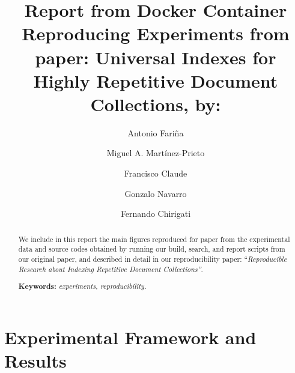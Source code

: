 \documentclass[review]{elsarticle}
\begin{document}
 
\begin{frontmatter}	
	\title{Report from Docker Container\\ Reproducing Experiments from paper: Universal Indexes for Highly Repetitive Document Collections, by:}
	\tnotetext[t1]{}


	\author[udc]{Antonio Fari\~na}

	\author[uva]{Miguel A. Mart\'inez-Prieto}

	\author[udp]{Francisco Claude}

	\author[uchile]{Gonzalo Navarro}
	
	\author[ny]{Fernando Chirigati}


	\address[udp]{Escuela de Inform\'atica y Telecomunicaciones, Universidad Diego Portales, Chile.\\}
	\address[udc]{Database Laboratory, University of A Coru\~na, Spain.\\}
	\address[uva]{DataWeb Research, Department of Computer Science, University of Valladolid, Spain.}		
	\address[uchile]{Department of Computer Science, University of Chile, Chile.}

	\address[ny] {Department of Computer Science and Engineering, New York University, New York City, NY, United States.}

	\begin{abstract}
We include in this report the main figures reproduced for paper \cite{CFMNis16.3} from the experimental data and source codes obtained by
running our build, search, and report scripts from our original paper, and described in detail in our reproducibility paper: {``\em Reproducible Research about Indexing Repetitive Document Collections''}.
\bigskip
\noindent

{\bf Keywords:} {\em experiments, reproducibility.}
	\end{abstract}

\end{frontmatter}



\section{Experimental Framework and Results}
\end{document}
